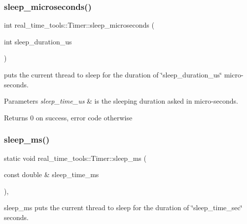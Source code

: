 \subsubsection{\texorpdfstring{sleep\+\_\+microseconds()}{sleep\_microseconds()}}
{\footnotesize\ttfamily int real\+\_\+time\+\_\+tools\+::\+Timer\+::sleep\+\_\+microseconds (\begin{DoxyParamCaption}\item[{int}]{sleep\+\_\+duration\+\_\+us }\end{DoxyParamCaption})\hspace{0.3cm}{\ttfamily [static]}}



puts the current thread to sleep for the duration of \char`\"{}sleep\+\_\+duration\+\_\+us\char`\"{} micro-\/seconds. 


\begin{DoxyParams}{Parameters}
{\em sleep\+\_\+time\+\_\+us} & is the sleeping duration asked in micro-\/seconds. \\
\hline
\end{DoxyParams}
\begin{DoxyReturn}{Returns}
0 on success, error code otherwise 
\end{DoxyReturn}
\mbox{\label{classreal__time__tools_1_1Timer_abb2ce808994282d63846e7fca544f818}} 
\subsubsection{\texorpdfstring{sleep\+\_\+ms()}{sleep\_ms()}}
{\footnotesize\ttfamily static void real\+\_\+time\+\_\+tools\+::\+Timer\+::sleep\+\_\+ms (\begin{DoxyParamCaption}\item[{const double \&}]{sleep\+\_\+time\+\_\+ms }\end{DoxyParamCaption})\hspace{0.3cm}{\ttfamily [inline]}, {\ttfamily [static]}}



sleep\+\_\+ms puts the current thread to sleep for the duration of \char`\"{}sleep\+\_\+time\+\_\+sec\char`\"{} seconds. 


